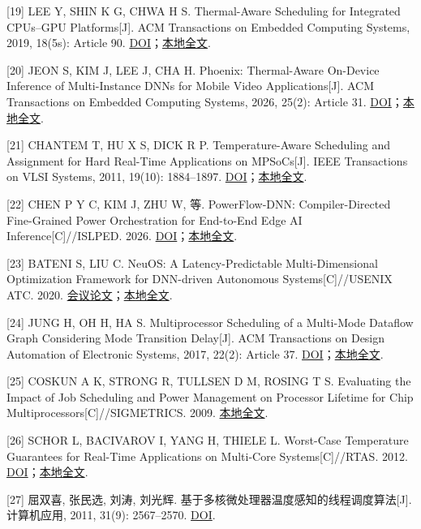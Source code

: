 {[}19{]} LEE Y, SHIN K G, CHWA H S. Thermal-Aware Scheduling for Integrated CPUs--GPU Platforms{[}J{]}. ACM Transactions on Embedded Computing Systems, 2019, 18(5s): Article 90. \href{https://doi.org/10.1145/3358235}{DOI}；\href{https://github.com/YBEMR/paper/blob/main/papers/2019_Lee_Thermal_Aware_Integrated_CPUs_GPU.pdf}{本地全文}.

{[}20{]} JEON S, KIM J, LEE J, CHA H. Phoenix: Thermal-Aware On-Device Inference of Multi-Instance DNNs for Mobile Video Applications{[}J{]}. ACM Transactions on Embedded Computing Systems, 2026, 25(2): Article 31. \href{https://doi.org/10.1145/3793860}{DOI}；\href{https://github.com/YBEMR/paper/blob/main/papers/2026_Jeon_Phoenix.pdf}{本地全文}.

{[}21{]} CHANTEM T, HU X S, DICK R P. Temperature-Aware Scheduling and Assignment for Hard Real-Time Applications on MPSoCs{[}J{]}. IEEE Transactions on VLSI Systems, 2011, 19(10): 1884--1897. \href{https://doi.org/10.1109/TVLSI.2010.2058873}{DOI}；\href{https://github.com/YBEMR/paper/blob/main/papers/2011_Temperature-Aware_Scheduling_and_Assignment_for.pdf}{本地全文}.

{[}22{]} CHEN P Y C, KIM J, ZHU W, 等. PowerFlow-DNN: Compiler-Directed Fine-Grained Power Orchestration for End-to-End Edge AI Inference{[}C{]}//ISLPED. 2026. \href{https://doi.org/10.1145/3816440.3818667}{DOI}；\href{https://github.com/YBEMR/paper/blob/main/papers/2026_Chen_PowerFlow_DNN_v3.pdf}{本地全文}.

{[}23{]} BATENI S, LIU C. NeuOS: A Latency-Predictable Multi-Dimensional Optimization Framework for DNN-driven Autonomous Systems{[}C{]}//USENIX ATC. 2020. \href{https://www.usenix.org/conference/atc20/presentation/bateni}{会议论文}；\href{https://github.com/YBEMR/paper/blob/main/papers/2020_NeuOS_A_Latency-Predictable\%20Multi-Dimensional.pdf}{本地全文}.

{[}24{]} JUNG H, OH H, HA S. Multiprocessor Scheduling of a Multi-Mode Dataflow Graph Considering Mode Transition Delay{[}J{]}. ACM Transactions on Design Automation of Electronic Systems, 2017, 22(2): Article 37. \href{https://doi.org/10.1145/2997645}{DOI}；\href{https://github.com/YBEMR/paper/blob/main/papers/2017_Multiprocessor_Scheduling_of_a_Multi-Mode_Dataflow_Graph_Considering_Mode_Transition_Delay.pdf}{本地全文}.

{[}25{]} COSKUN A K, STRONG R, TULLSEN D M, ROSING T S. Evaluating the Impact of Job Scheduling and Power Management on Processor Lifetime for Chip Multiprocessors{[}C{]}//SIGMETRICS. 2009. \href{https://github.com/YBEMR/paper/blob/main/papers/2009_Coskun_Job_Scheduling_Power_Management_Processor_Lifetime.pdf}{本地全文}.

{[}26{]} SCHOR L, BACIVAROV I, YANG H, THIELE L. Worst-Case Temperature Guarantees for Real-Time Applications on Multi-Core Systems{[}C{]}//RTAS. 2012. \href{https://doi.org/10.1109/RTAS.2012.14}{DOI}；\href{https://github.com/YBEMR/paper/blob/main/papers/2012_Schor.pdf}{本地全文}.

{[}27{]} 屈双喜, 张民选, 刘涛, 刘光辉. 基于多核微处理器温度感知的线程调度算法{[}J{]}. 计算机应用, 2011, 31(9): 2567--2570. \href{https://doi.org/10.3724/SP.J.1087.2011.02567}{DOI}.
